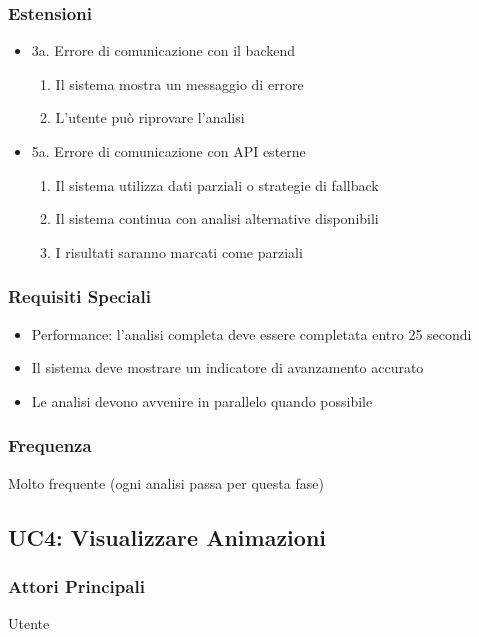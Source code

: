 \subsubsection{Estensioni}
\begin{itemize}
    \item 3a. Errore di comunicazione con il backend
    \begin{enumerate}
        \item Il sistema mostra un messaggio di errore
        \item L'utente può riprovare l'analisi
    \end{enumerate}
    
    \item 5a. Errore di comunicazione con API esterne
    \begin{enumerate}
        \item Il sistema utilizza dati parziali o strategie di fallback
        \item Il sistema continua con analisi alternative disponibili
        \item I risultati saranno marcati come parziali
    \end{enumerate}
\end{itemize}

\subsubsection{Requisiti Speciali}
\begin{itemize}
    \item Performance: l'analisi completa deve essere completata entro 25 secondi
    \item Il sistema deve mostrare un indicatore di avanzamento accurato
    \item Le analisi devono avvenire in parallelo quando possibile
\end{itemize}

\subsubsection{Frequenza}
Molto frequente (ogni analisi passa per questa fase)

\subsection{UC4: Visualizzare Animazioni}

\subsubsection{Attori Principali}
Utente

